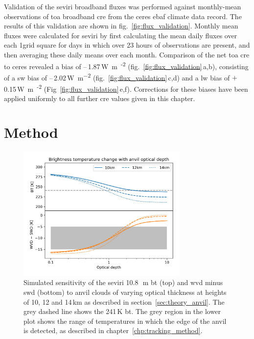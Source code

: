 Validation of the \acrshort{seviri} broadband fluxes was performed against monthly-mean observations of \acrshort{toa} broadband \acrshort{cre} from the \acrfull{ceres} \citep{loeb_clouds_2018} \acrfull{ebaf} climate data record. 
The results of this validation are shown in fig.~\ref{fig:flux_validation}. 
Monthly mean fluxes were calculated for \acrshort{seviri} by first calculating the mean daily fluxes over each 1\textdegree grid square for days in which over 23 hours of observations are present, and then averaging these daily means over each month. 
Comparison of the net \acrshort{toa} \acrshort{cre} to \acrshort{ceres} revealed a bias of --\,1.87\,\unit{W m\textsuperscript{-2}} (fig.~\ref{fig:flux_validation}\,a,b), consisting of a \acrshort{sw} bias of --\,2.02\,\unit{W m^{-2}} (fig.~\ref{fig:flux_validation}\,c,d) and a \acrshort{lw} bias of $+$\,0.15\,\unit{W m\textsuperscript{-2}} (Fig~\ref{fig:flux_validation}\,e,f). 
Corrections for these biases have been applied uniformly to all further \acrshort{cre} values given in this chapter.


\section{Method}


\begin{figure}[tp]
    \centering
    \includegraphics[width=0.75\textwidth]{figures/chapter4_04.png}
    \caption[
    Simulated sensitivity of the \acrshort{seviri} 10.8\,\unit{\mu m} \acrshort{bt} (top) and \acrshort{wvd} minus \acrshort{swd} (bottom) to anvil clouds of varying optical thickness at heights of 10, 12 and 14\,\unit{km}
    ]{
    Simulated sensitivity of the \acrshort{seviri} 10.8\,\unit{\mu m} \acrshort{bt} (top) and \acrshort{wvd} minus \acrshort{swd} (bottom) to anvil clouds of varying optical thickness at heights of 10, 12 and 14\,\unit{km} as described in section~\ref{sec:theory_anvil}. The grey dashed line shows the 241\,\unit{K} \acrshort{bt}. The grey region in the lower plot shows the range of temperatures in which the edge of the anvil is detected, as described in chapter~\ref{chp:tracking_method}.
    }
    \label{fig:S_anvil_sensitivity}
\end{figure}

